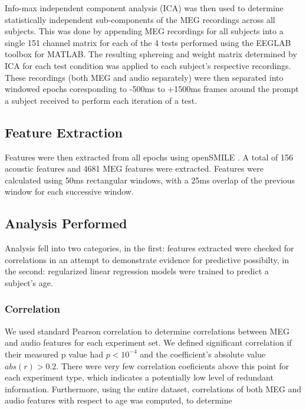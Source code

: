 \documentclass[a4paper]{article}
\begin{document}
Info-max independent component analysis (ICA) \cite{Bell1995} was then used to determine statistically independent sub-components of the MEG recordings across all subjects. This was done by appending MEG recordings for all subjects into a single 151 channel matrix for each of the 4 tests performed using the EEGLAB toolbox \cite{Delorme04eeglab} for MATLAB. The resulting sphereing and weight matrix determined by ICA for each test condition was applied to each subject's respective recordings. These recordings (both MEG and audio separately) were then separated into windowed epochs coresponding to -500ms to +1500ms frames around the prompt a subject received to perform each iteration of a test.

\subsection{Feature Extraction}

Features were then extracted from all epochs using openSMILE \cite{Eyben13-RDI}. A total of 156 acoustic features and 4681 MEG features were extracted. Features were calculated using 50ms rectangular windows, with a 25ms overlap of the previous window for each successive window.

\subsection{Analysis Performed}

Analysis fell into two categories, in the first: features extracted were checked for correlations in an attempt to demonstrate evidence for predictive possibilty, in the second: regularized linear regression models were trained to predict a subject's age.

\subsubsection{Correlation}

We used standard Pearson correlation to determine correlations between MEG and audio features for each experiment set. We defined significant correlation if their measured p value had $p < 10^{-4}$ and the coefficient's absolute value $abs(r) > 0.2$. There were very few correlation coeficients above this point for each experiment type, which indicates a potentially low level of redundant information. Furthermore, using the entire dataset, correlations of both MEG and audio features with respect to age was computed, to determine
\end{document}
